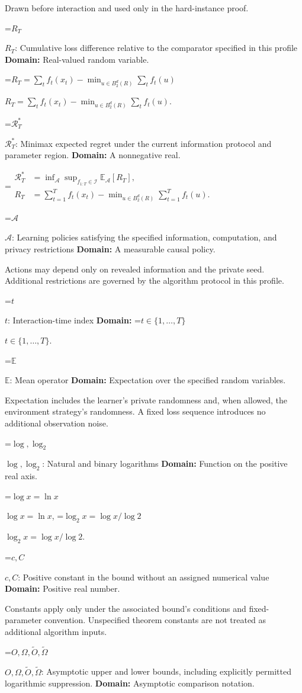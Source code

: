 \documentclass[10pt,a4paper]{article}
\newcommand{\AtlasMath}[1]{\par\begingroup\centering\setbox0=\hbox{$\displaystyle #1$}\ifdim\wd0>1.4\linewidth\typeout{ATLAS WIDE FORMULA: \the\wd0}\fi\ifdim\wd0>\linewidth\resizebox{\linewidth}{!}{\box0}\else\box0\fi\par\endgroup}
\newcommand{\AtlasInlineMath}[1]{\begingroup\setbox0=\hbox{$#1$}\ifdim\wd0>.4\linewidth\endgroup\AtlasMath{#1}\else\endgroup$#1$\fi}
\begin{document}
Drawn before interaction and used only in the hard-instance proof.

\AtlasInlineMath{R_T}: Cumulative loss difference relative to the comparator specified in this profile \textbf{Domain:} Real-valued random variable.

\AtlasInlineMath{R_T=\sum_tf_t(x_t)-\min_{u\in B_2^d(R)}\sum_tf_t(u)}.

\AtlasInlineMath{\mathcal R_T^*}: Minimax expected regret under the current information protocol and parameter region. \textbf{Domain:} A nonnegative real.


\AtlasMath{\begin{aligned}\mathcal R_T^*&=\inf_{\mathcal A}\sup_{f_{1:T}\in\mathcal I}\mathbb E_{\mathcal A}[R_T],\\ R_T&=\sum_{t=1}^T f_t(x_t)-\min_{u\in B_2^d(R)}\sum_{t=1}^T f_t(u).\end{aligned}}


\AtlasInlineMath{\mathcal A}: Learning policies satisfying the specified information, computation, and privacy restrictions \textbf{Domain:} A measurable causal policy.

Actions may depend only on revealed information and the private seed. Additional restrictions are governed by the algorithm protocol in this profile.

\AtlasInlineMath{t}: Interaction-time index \textbf{Domain:} \AtlasInlineMath{t\in\{1,\ldots,T\}}.

\AtlasInlineMath{\mathbb E}: Mean operator \textbf{Domain:} Expectation over the specified random variables.

Expectation includes the learner's private randomness and, when allowed, the environment strategy's randomness. A fixed loss sequence introduces no additional observation noise.

\AtlasInlineMath{\log,\log_2}: Natural and binary logarithms \textbf{Domain:} Function on the positive real axis.

\AtlasInlineMath{\log x=\ln x}, \AtlasInlineMath{\log_2x=\log x/\log2}.

\AtlasInlineMath{c,C}: Positive constant in the bound without an assigned numerical value \textbf{Domain:} Positive real number.

Constants apply only under the associated bound’s conditions and fixed-parameter convention. Unspecified theorem constants are not treated as additional algorithm inputs.

\AtlasInlineMath{O,\Omega,\widetilde O,\widetilde\Omega}: Asymptotic upper and lower bounds, including explicitly permitted logarithmic suppression. \textbf{Domain:} Asymptotic comparison notation.
\end{document}
